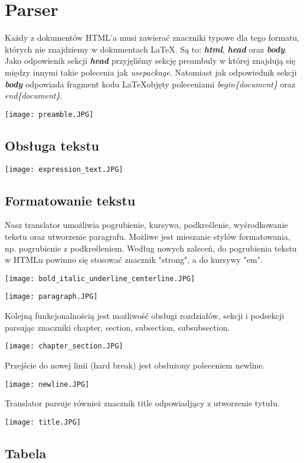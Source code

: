 \section{Parser}

Każdy z dokumentów HTML'a musi zawierać znaczniki typowe dla tego formatu, których nie znajdziemy w dokumentach \LaTeX. Są to: \textbf{\textit{html}},
\textbf{\textit{head}} oraz \textbf{\textit{body}}. Jako odpowienik sekcji \textbf{\textit{head}} przyjęliśmy sekcję preambuly w której 
znajdują się między innymi takie polecenia jak \textit{usepackage}. Natomiast jak odpowiednik sekcji \textbf{\textit{body}} odpowiada fragment kodu 
\LaTeX \space objęty poleceniami \textit{begin\{document\}} oraz \textit{end\{document\}}.

\texttt{[image: preamble.JPG]}

\subsection{Obsługa tekstu}

\texttt{[image: expression\_text.JPG]}

\subsection{Formatowanie tekstu}

Nasz translator umożliwia pogrubienie, kursywa, podkreślenie, wyśrodkowanie tekstu oraz utworzenie paragrafu. Możliwe jest mieszanie
stylów formatowania, np. pogrubienie z podkreśleniem. Według nowych zaleceń, do pogrubienia tekstu w HTMLu powinno się stosować znacznik
"strong", a do kursywy "em".

\texttt{[image: bold\_italic\_underline\_centerline.JPG]}

\texttt{[image: paragraph.JPG]}


Kolejną funkcjonalnością jest możliwość obsługi rozdziałów, sekcji i podsekcji parsując znaczniki chapter, section, subsection, 
subsubsection.


\texttt{[image: chapter\_section.JPG]}


Przejście do nowej linii (hard break) jest obsłużony poleceniem newline.

\texttt{[image: newline.JPG]}


Translator parsuje również znacznik title odpowiadjący z utworzenie tytułu.

\texttt{[image: title.JPG]}

\subsection{Tabela}

